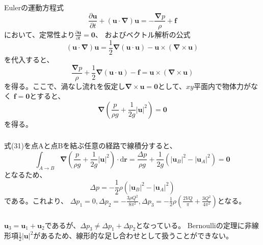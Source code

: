 \documentclass[a4paper]{jsarticle}
\begin{document}
\subsubsection{}
Eulerの運動方程式
\begin{equation}
  \frac{\partial \bm{u}}{\partial t} + \left(\bm{u} \cdot \bm{\nabla}\right) \bm{u}
  = -\frac{\bm{\nabla} p}{\rho} + \bm{f}
\end{equation}
において、定常性より$\frac{\partial \bm{u}}{\partial t} = \bm{0}$、
およびベクトル解析の公式
\begin{equation}
  \left(\bm{u} \cdot \bm{\nabla}\right) \bm{u} = \frac{1}{2} \bm{\nabla} (\bm{u} \cdot \bm{u}) - \bm{u} \times (\bm{\nabla \times \bm{u}})
\end{equation}
を代入すると、
\begin{equation}
  \frac{\bm{\nabla} p}{\rho} + \frac{1}{2} \bm{\nabla} (\bm{u} \cdot \bm{u}) - \bm{f}
  = \bm{u} \times (\bm{\nabla \times \bm{u}})
\end{equation}
を得る。ここで、渦なし流れを仮定し$\bm{\nabla \times \bm{u}} = \bm{0}$として、$xy$平面内で物体力がなく
$\bm{f} = \bm{0}$とすると、
\begin{equation}
  \bm{\nabla} \left(\frac{p}{\rho g} + \frac{1}{2g}\left|\bm{u}\right|^2\right) = \bm{0}
\end{equation}
を得る。

\subsubsection{}
式(31)を点Aと点Bを結ぶ任意の経路で線積分すると、
\begin{equation}
  \int_{A \rightarrow B} \bm{\nabla} \left(\frac{p}{\rho g} + \frac{1}{2g}\left|\bm{u}\right|^2\right) \cdot \mathrm{d} \bm{r} = 
  \frac{\Delta p}{\rho g} + \frac{1}{2g} \left(\left|\bm{u}_B\right|^2 - \left|\bm{u}_A\right|^2\right)
  =\bm{0}
\end{equation}
となるため、
\begin{equation}
  \Delta p = -\frac{1}{2} \rho \left(\left|\bm{u}_B\right|^2 - \left|\bm{u}_A\right|^2\right)
\end{equation}
である。これより、
$\Delta p_1 = 0, \Delta p_2 = -\frac{3 \rho Q^2}{8 \pi^2}, \Delta p_3 = -\frac{1}{2} \rho \left(\frac{2 V Q}{\pi} + \frac{3 Q^2}{4 \pi^2}\right)$となる。 

\subsubsection{}
$\bm{u}_3 = \bm{u}_1 + \bm{u}_2$であるが、$\Delta p_3 \neq \Delta p_1 + \Delta p_2$となっている。
Bernoulliの定理に非線形項$\frac{1}{2}\left|\bm{u}\right|^2$があるため、線形的な足し合わせとして扱うことができない。
\end{document}
